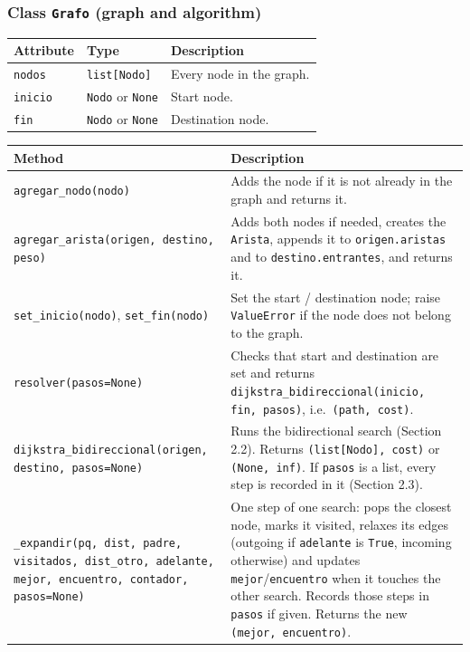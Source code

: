 \documentclass[11pt,letterpaper]{article}
\newcommand{\code}[1]{\texttt{#1}}
\begin{document}
\subsubsection*{Class \code{Grafo} (graph and algorithm)}

\begin{tabularx}{\textwidth}{llL}
\toprule
\textbf{Attribute} & \textbf{Type} & \textbf{Description} \\
\midrule
\code{nodos}  & \code{list[Nodo]}      & Every node in the graph. \\
\code{inicio} & \code{Nodo} or \code{None} & Start node. \\
\code{fin}    & \code{Nodo} or \code{None} & Destination node. \\
\bottomrule
\end{tabularx}

\begin{tabularx}{\textwidth}{>{\raggedright\arraybackslash}p{5.2cm}L}
\toprule
\textbf{Method} & \textbf{Description} \\
\midrule
\code{agregar\_nodo(nodo)} & Adds the node if it is not already in the graph and returns it. \\
\code{agregar\_arista(origen, destino, peso)} & Adds both nodes if needed, creates the \code{Arista}, appends it to \code{origen.aristas} and to \code{destino.entrantes}, and returns it. \\
\code{set\_inicio(nodo)}, \code{set\_fin(nodo)} & Set the start / destination node; raise \code{ValueError} if the node does not belong to the graph. \\
\code{resolver(pasos=None)} & Checks that start and destination are set and returns \code{dijkstra\_bidireccional(inicio, fin, pasos)}, i.e.\ \code{(path, cost)}. \\
\code{dijkstra\_bidireccional(}\allowbreak\code{origen, destino, pasos=None)} & Runs the bidirectional search (Section 2.2). Returns \code{(list[Nodo], cost)} or \code{(None, inf)}. If \code{pasos} is a list, every step is recorded in it (Section 2.3). \\
\code{\_expandir(pq, dist, padre, visitados, dist\_otro, adelante, mejor, encuentro, contador, pasos=None)} & One step of one search: pops the closest node, marks it visited, relaxes its edges (outgoing if \code{adelante} is \code{True}, incoming otherwise) and updates \code{mejor}/\code{encuentro} when it touches the other search. Records those steps in \code{pasos} if given. Returns the new \code{(mejor, encuentro)}. \\
\bottomrule
\end{tabularx}
\end{document}
